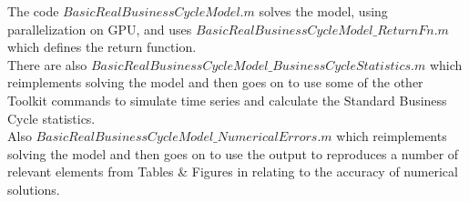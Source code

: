The code $BasicRealBusinessCycleModel.m$ solves the model, using parallelization on GPU, and uses $BasicRealBusinessCycleModel\_{}ReturnFn.m$ which defines the return function. \\
There are also $BasicRealBusinessCycleModel\_{}BusinessCycleStatistics.m$ which reimplements solving the model and then goes on to use some of the other
Toolkit commands to simulate time series and calculate the Standard Business Cycle statistics. \\
Also $BasicRealBusinessCycleModel\_{}NumericalErrors.m$
which reimplements solving the model and then goes on to use the output to reproduces a number of relevant elements from 
Tables \& Figures in \cite*{AruobaFernandezVillaverdeRubioRamirez2006} relating to the accuracy of numerical solutions.
% 
% 
% 
% 
% 
% 
% 
% 
% 
% 
% 

% 
% 
% 
% 

%

